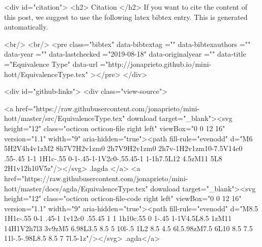   
  <div id="citation">
  <h2> Citation </h2>
  If you want to cite the content of this post,
  we suggest to use the following latex bibtex entry.
  This is generated automatically.

  <br/>
  <br/>
  <pre class="bibtex"
       data-bibtextag =""
       data-bibtexauthors =""
       data-year =""
       data-lastchecked ="2019-08-18"
       data-originalyear =""
       data-title ="Equivalence Type"
       data-url ="http://jonaprieto.github.io/mini-hott/EquivalenceType.tex"
  ></pre>
  </div>
  

  <div id="github-links">
    <div class="view-source">
      
        <a href="https://raw.githubusercontent.com/jonaprieto/mini-hott/master/src/EquivalenceType.tex" download target="_blank"><svg height="12" class="octicon octicon-file right left" viewBox="0 0 12 16" version="1.1" width="9" aria-hidden="true"><path fill-rule="evenodd" d="M6 5H2V4h4v1zM2 8h7V7H2v1zm0 2h7V9H2v1zm0 2h7v-1H2v1zm10-7.5V14c0 .55-.45 1-1 1H1c-.55 0-1-.45-1-1V2c0-.55.45-1 1-1h7.5L12 4.5zM11 5L8 2H1v12h10V5z"/></svg> .lagda </a>
        <a href="https://raw.githubusercontent.com/jonaprieto/mini-hott/master/docs/agda/EquivalenceType.tex" download target="_blank"><svg height="12" class="octicon octicon-file-code right left" viewBox="0 0 12 16" version="1.1" width="9" aria-hidden="true"><path fill-rule="evenodd" d="M8.5 1H1c-.55 0-1 .45-1 1v12c0 .55.45 1 1 1h10c.55 0 1-.45 1-1V4.5L8.5 1zM11 14H1V2h7l3 3v9zM5 6.98L3.5 8.5 5 10l-.5 1L2 8.5 4.5 6l.5.98zM7.5 6L10 8.5 7.5 11l-.5-.98L8.5 8.5 7 7l.5-1z"/></svg> .agda</a>
      
